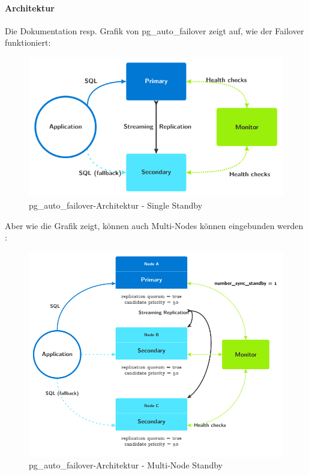 \begin{flushleft}
    \paragraph{Architektur}
    Die Dokumentation resp. Grafik von pg\_auto\_failover  \cite{PZZIZ5RT} zeigt auf, wie der Failover funktioniert:
    \begin{figure}[H]
        \centering
        \includegraphics[width=0.75\linewidth]{source/implementation/evaluation/postgresql_ha_solutions/pg_auto_failover/pg_auto-failover_arch-single-standby}
        \caption{pg\_auto\_failover-Architektur - Single Standby}
        \label{fig:pg_auto-failover_arch-single-standby}
    \end{figure}
    Aber wie die Grafik zeigt, können auch Multi-Nodes können eingebunden werden \cite{4ZKBDG57}:
    \begin{figure}[H]
        \centering
        \includegraphics[width=0.75\linewidth]{source/implementation/evaluation/postgresql_ha_solutions/pg_auto_failover/pg_auto-failover_arch-multi-standby}
        \caption{pg\_auto\_failover-Architektur - Multi-Node Standby}
        \label{fig:pg_auto-failover_arch-multi-standby}
    \end{figure}


\end{flushleft}

